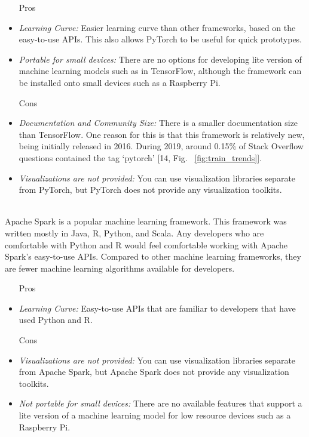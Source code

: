 \documentclass[12pt,journal,compsoc]{IEEEtran}
\newenvironment{subs}
  {\adjustwidth{1em}{0pt}}
  {\endadjustwidth}
\begin{document}
\begin{subs}
\begin{subs}
\begin{subs}
\begin{subs}
\begin{itemize}
    \item [{Pros}]
    \item \emph{Learning Curve:} Easier learning curve than other frameworks, based on the easy-to-use APIs. This also allows PyTorch to be useful for quick prototypes.
    \item \emph{Portable for small devices:} There are no options for developing lite version of machine learning models such as in TensorFlow, although the framework can be installed onto small devices such as a Raspberry Pi.
    \item [{Cons}]
    \item \emph{Documentation and Community Size:} There is a smaller documentation size than TensorFlow. One reason for this is that this framework is relatively new, being initially released in 2016. During 2019, around 0.15\% of Stack Overflow questions contained the tag ‘pytorch’ [14, Fig. ~\ref{fig:train_trends}].
    \item \emph{Visualizations are not provided:} You can use visualization libraries separate from PyTorch, but PyTorch does not provide any visualization toolkits. 
\end{itemize}
\end{subs}

\\
Apache Spark is a popular machine learning framework. This framework was written mostly in Java, R, Python, and Scala. Any developers who are comfortable with Python and R would feel comfortable working with Apache Spark’s easy-to-use APIs. Compared to other machine learning frameworks, they are fewer machine learning algorithms available for developers.

\begin{subs}
\begin{itemize}
    \item [{Pros}]
    \item \emph{Learning Curve:} Easy-to-use APIs that are familiar to developers that have used Python and R.
    \item [{Cons}]
    \item \emph{Visualizations are not provided:} You can use visualization libraries separate from Apache Spark, but Apache Spark does not provide any visualization toolkits. 
    \item \emph{Not portable for small devices:} There are no available features that support a lite version of a machine learning model for low resource devices such as a Raspberry Pi.
\end{itemize}
\end{subs}


\end{subs}
\end{subs}
\end{subs}
\end{document}
